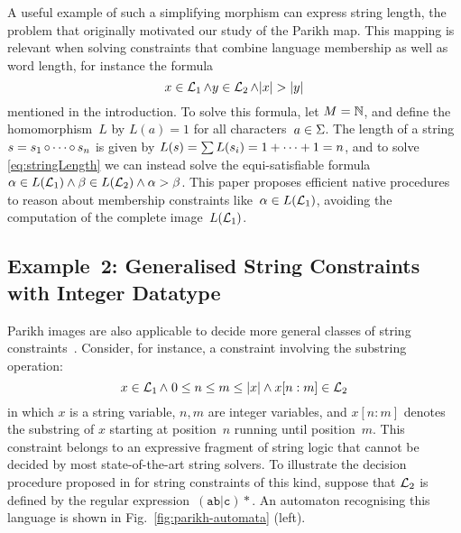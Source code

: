 \documentclass[acmsmall,review,anonymous,screen]{acmart}\settopmatter{printfolios=true,printccs=true,printacmref=true}
\theoremstyle{definition}
\begin{document}
A useful example of such a simplifying morphism can express string
length, the problem that originally motivated our study of the Parikh
map. This mapping is relevant when solving constraints that combine
language membership as well as word length, for instance the formula
\begin{equation}\label{eq:stringLength}
x \in \operatorname{\mathcal{L}}_1 \wedge y \in \operatorname{\mathcal{L}}_2 \wedge |x| > |y|
\end{equation}
mentioned in the introduction. To solve this formula, let
$M = \mathbb{N}$, and define the homomorphism~$L$ by $L(a) = 1$
for all characters~$a \in \Sigma$. The length of a string
$s = s_1 \operatorname{\circ} \cdots \operatorname{\circ} s_n$ is given by
$L(s) = \sum L(s_i) = 1 + \cdots + 1 = n$, and to solve
\eqref{eq:stringLength} we can instead solve the equi-satisfiable
formula~$\alpha \in L(\operatorname{\mathcal{L}}_1) \wedge \beta \in L(\operatorname{\mathcal{L}}_2)
\wedge \alpha > \beta$. This paper proposes efficient native
procedures to reason about membership constraints
like~$\alpha \in L(\operatorname{\mathcal{L}}_1)$, avoiding the computation of
the complete image~$L(\operatorname{\mathcal{L}}_1)$.

\subsection{Example~2: Generalised String Constraints with Integer
  Datatype}\label{sec:parikh-automata}

Parikh images are also applicable to decide more general classes of
string constraints~\cite{ostrich-plus}. Consider, for instance, a
constraint involving the substring operation:
\begin{equation}
  \label{eq:substring}
  x \in \operatorname{\mathcal{L}}_1 \wedge \; 0 \leq n \leq m \leq |x| \wedge x[n:m] \in \operatorname{\mathcal{L}}_2
\end{equation}
in which $x$ is a string variable, $n, m$ are integer variables, and
$x[n:m]$ denotes the substring of $x$ starting at position~$n$ running
until position~$m$. This constraint belongs to an expressive fragment
of string logic that cannot be decided by most state-of-the-art string
solvers. To illustrate the decision procedure proposed in
\cite{ostrich-plus} for string constraints of this kind, suppose that
$\operatorname{\mathcal{L}}_2$ is defined by the regular
expression~$\mathtt{(ab|c)*}$. An automaton recognising this language
is shown in Fig.~\ref{fig:parikh-automata} (left).
\end{document}
